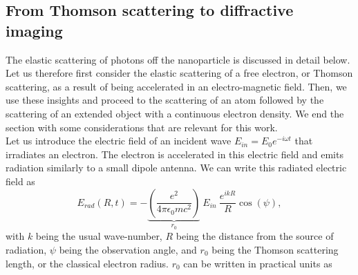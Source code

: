 \subsection{From Thomson scattering to diffractive imaging}\label{sec:saxs}
The elastic scattering of photons off the nanoparticle is discussed in detail below. Let us therefore first consider the elastic scattering of a free electron, or Thomson scattering, as a result of being accelerated in an electro-magnetic field. Then, we use these insights and proceed to the scattering of an atom followed by the scattering of an extended object with a continuous electron density. We end the section with some considerations that are relevant for this work.\\[1\baselineskip]
Let us introduce the electric field of an incident wave $E_{in}=E_{0}e^{-i\omega t}$ that irradiates an electron. The electron is accelerated in this electric field and emits radiation similarly to a small dipole antenna. We can write this radiated electric field as \citep{Als-Nielson-2011-JWS}
\begin{equation}
E_{rad}(R,t)=-\underbrace{\left(\frac{e^2}{4\pi \epsilon_0 m c^2}\right)}_{r_{0}}\ E_{in}\ \frac{e^{i k R}}{R} \cos\left(\psi\right),
\label{eq:radiated-by-electron}
\end{equation}
with $k$ being the usual wave-number, $R$ being the distance from the source of radiation, $\psi$ being the observation angle, and $r_0$ being the Thomson scattering length, or the classical electron radius. $r_0$ can be written in practical units as
